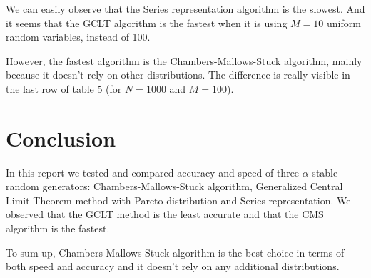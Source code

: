 \documentclass[12pt,titlepage]{article}
\begin{document}
We can easily observe that the Series representation algorithm is the slowest. And it seems that the GCLT algorithm is the fastest when it is using $M=10$ uniform random variables, instead of 100.

However, the fastest algorithm is the Chambers-Mallows-Stuck algorithm, mainly because it doesn't rely on other distributions. The difference is really visible in the last row of table 5 (for $N=1000$ and $M=100$).

\section{Conclusion}

In this report we tested and compared accuracy and speed of three $\alpha$-stable random generators: Chambers-Mallows-Stuck algorithm, Generalized Central Limit Theorem method with Pareto distribution and Series representation. We observed that the GCLT method is the least accurate and that the CMS algorithm is the fastest.

To sum up, Chambers-Mallows-Stuck algorithm is the best choice in terms of both speed and accuracy and it doesn't rely on any additional distributions.
\end{document}
